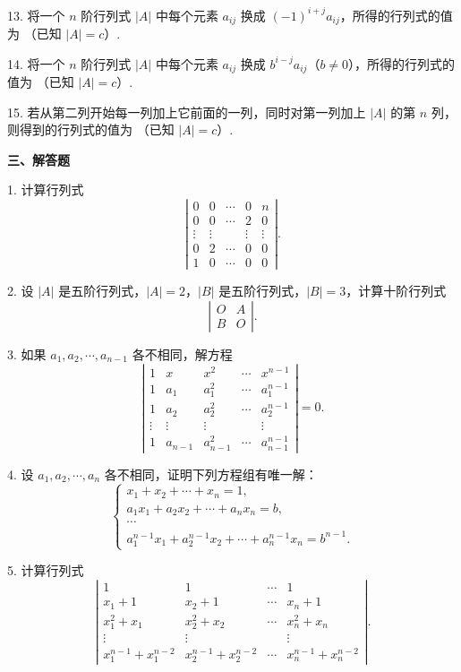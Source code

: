 \documentclass[UTF8,12pt,a4paper,fontset=fandol]{ctexart}
\begin{document}
13. 将一个 $n$ 阶行列式 $|A|$ 中每个元素 $a_{ij}$ 换成 $(-1)^{i+j}a_{ij}$，所得的行列式的值为
\underline{\hspace{3em}}（已知 $|A|=c$）.

14. 将一个 $n$ 阶行列式 $|A|$ 中每个元素 $a_{ij}$ 换成 $b^{i-j}a_{ij}$（$b\ne0$），所得的行列式的值为
\underline{\hspace{3em}}（已知 $|A|=c$）.

15. 若从第二列开始每一列加上它前面的一列，同时对第一列加上 $|A|$ 的第 $n$ 列，则得到的行列式的值为
\underline{\hspace{3em}}（已知 $|A|=c$）.

\noindent\textbf{三、解答题}

1. 计算行列式
\[
\left|\begin{array}{ccccc}
0&0&\cdots&0&n\\
0&0&\cdots&2&0\\
\vdots&\vdots&&\vdots&\vdots\\
0&2&\cdots&0&0\\
1&0&\cdots&0&0
\end{array}\right|.
\]

2. 设 $|A|$ 是五阶行列式，$|A|=2$，$|B|$ 是五阶行列式，$|B|=3$，计算十阶行列式
\[
\left|\begin{array}{cc}
O&A\\
B&O
\end{array}\right|.
\]

3. 如果 $a_1,a_2,\cdots,a_{n-1}$ 各不相同，解方程
\[
\left|\begin{array}{ccccc}
1&x&x^2&\cdots&x^{n-1}\\
1&a_1&a_1^2&\cdots&a_1^{n-1}\\
1&a_2&a_2^2&\cdots&a_2^{n-1}\\
\vdots&\vdots&\vdots&&\vdots\\
1&a_{n-1}&a_{n-1}^2&\cdots&a_{n-1}^{n-1}
\end{array}\right|=0.
\]

4. 设 $a_1,a_2,\cdots,a_n$ 各不相同，证明下列方程组有唯一解：
\[
\left\{\begin{array}{l}
x_1+x_2+\cdots+x_n=1,\\
a_1x_1+a_2x_2+\cdots+a_nx_n=b,\\
\cdots\\
a_1^{n-1}x_1+a_2^{n-1}x_2+\cdots+a_n^{n-1}x_n=b^{n-1}.
\end{array}\right.
\]

5. 计算行列式
\[
\left|\begin{array}{cccc}
1&1&\cdots&1\\
x_1+1&x_2+1&\cdots&x_n+1\\
x_1^2+x_1&x_2^2+x_2&\cdots&x_n^2+x_n\\
\vdots&\vdots&&\vdots\\
x_1^{n-1}+x_1^{n-2}&x_2^{n-1}+x_2^{n-2}&\cdots&x_n^{n-1}+x_n^{n-2}
\end{array}\right|.
\]
\end{document}
